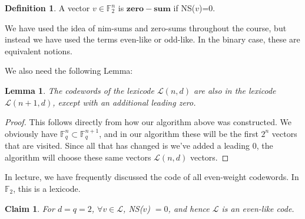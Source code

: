 \documentclass{article}
\theoremstyle{plain}
\newtheorem{lemma}[theorem]{Lemma}
\newtheorem{claim}[theorem]{Claim}
\theoremstyle{definition}
\newtheorem{defn}[theorem]{Definition}
\begin{document}
\begin{defn}
A vector $v\in \mathbb{F}_2^n$ is $\mathbf{zero-sum}$ if NS($v$)=0.
\end{defn}

We have used the idea of nim-sums and zero-sums throughout the course, but instead we have
used the terms even-like or odd-like.  In the binary case, these are equivalent notions.

We also need the following Lemma:

\begin{lemma}
The codewords of the lexicode $\mathcal{L}(n,d)$ are also in the lexicode $\mathcal{L}(n+1,d)$, except with an additional leading zero.
\end{lemma}

\begin{proof}
This follows directly from how our algorithm above was constructed.  We obviously have $\mathbb{F}_q^n \subset \mathbb{F}_q^{n+1}$, and in our algorithm these will be
the first $2^n$ vectors that are visited.  Since all that has changed is we've added a leading $0$, the algorithm will choose these same vectors $\mathcal{L}(n,d)$ vectors.
\end{proof}

In lecture, we have frequently discussed the code of all even-weight codewords.  In $\mathbb{F}_2$, this is a lexicode.

\begin{claim}
For $d=q=2$, $\forall v\in \mathcal{L}$, NS($v$) $= 0$, and hence $\mathcal{L}$ is an even-like code.
\end{claim}
\end{document}
